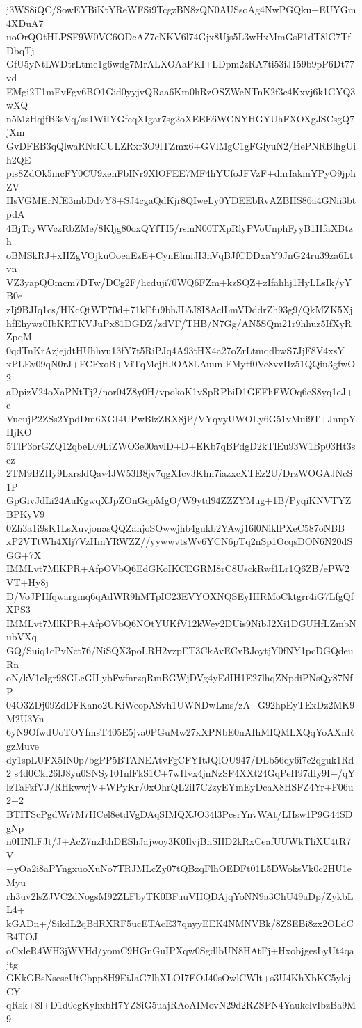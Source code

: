 j3WS8iQC/SowEYBiKtYReWFSi9TcgzBN8zQN0AUSsoAg4NwPGQku+EUYGm4XDuA7
uoOrQOtHLPSF9W0VC6ODcAZ7eNKV6l74Gjx8Ujs5L3wHxMmGsF1dT8lG7TfDbqTj
GfU5yNtLWDtrLtme1g6wdg7MrALXOAaPKI+LDpm2zRA7ti53iJ159b9pP6Dt77vd
EMgi2T1mEvFgv6BO1Gid0yyjvQRaa6Km0hRzOSZWeNTnK2f3c4Kxvj6k1GYQ3wXQ
n5MzHqjfB3sVq/ss1WiIYGfeqXIgar7sg2oXEEE6WCNYHGYUhFXOXgJSCsgQ7jXm
GvDFEB3qQlwaRNtICULZRxr3O9lTZmx6+GVlMgC1gFGlyuN2/HePNRBlhgUih2QE
pis8ZdOk5mcFY0CU9xenFbINr9XlOFEE7MF4hYUfoJFVzF+dnrIakmYPyO9jphZV
HsVGMErNfE3mbDdvY8+SJ4cgaQdKjr8QIweLy0YDEEbRvAZBHS86a4GNii3btpdA
4BjTcyWVczRbZMe/8Kljg80oxQYfTI5/rsmN00TXpRlyPVoUnphFyyB1HfaXBtzh
oBMSkRJ+xHZgVOjkuOoeaEzE+CynElmiJI3nVqBJfCDDxaY9JnG24ru39za6Ltvn
VZ3yapQOmcm7DTw/DCg2F/hcduji70WQ6FZm+kzSQZ+zIfahhj1HyLLsIk/yYB0e
zIj9BJIq1cs/HKcQtWP70d+71kEfu9bhJL5J8I8AclLmVDddrZh93g9/QkMZK5Xj
hfEhywz0IbKRTKVJuPx81DGDZ/zdVF/THB/N7Gg/AN5SQm21r9hhuz5IfXyRZpqM
0qdTnKrAzjejdtHUhhvu13fY7t5RiPJq4A93tHX4a27oZrLtmqdbwS7JjF8V4xsY
xPLEv09qN0rJ+FCFxoB+ViTqMejHJOA8LAuunlFMytf0Vc8vvIIz51QQiu3gfwO2
aDpizV24oXaPNtTj2/nor04Z8y0H/vpokoK1vSpRPbiD1GEFhFWOq6eS8yq1eJ+c
VucujP2ZSs2YpdDm6XGI4UPwBlzZRX8jP/VYqvyUWOLy6G51vMui9T+JnnpYHjKO
5TlP3orGZQ12qbeL09LiZWO3e00avlD+D+EKb7qBPdgD2kTlEu93W1Bp03Ht3scz
2TM9BZHy9LxrsldQav4JW53B8jv7qgXIcv3Khn7iazxcXTEz2U/DrzWOGAJNcS1P
GpGivJdLi24AuKgwqXJpZOnGqpMgO/W9ytd94ZZZYMug+1B/PyqiKNVTYZBPKyV9
0Zh3a1i9sK1LsXuvjonasQQZahjoSOwwjhb4gukb2YAwj16l0NiklPXeC587oNBB
xP2VTtWh4Xlj7VzHmYRWZZ//yywwvtsWv6YCN6pTq2nSp1OcqsDON6N20dSGG+7X
IMMLvt7MlKPR+AfpOVbQ6EdGKoIKCEGRM8rC8UsckRwf1Lr1Q6ZB/ePW2VT+Hy8j
D/VoJPHfqwargmq6qAdWR9hMTpIC23EVYOXNQSEyIHRMoCktgrr4iG7LfgQfXPS3
IMMLvt7MlKPR+AfpOVbQ6NOtYUKfV12kWey2DUis9NibJ2Xi1DGUHfLZmbNubVXq
GQ/Suiq1cPvNct76/NiSQX3poLRH2vzpET3CkAvECvBJoytjY0fNY1pcDGQdeuRn
oN/kV1cIgr9SGLcGILybFwfnrzqRmBGWjDVg4yEdIH1E27lhqZNpdiPNsQy87NfP
04O3ZDj09ZdDFKano2UKiWeopASvh1UWNDwLms/zA+G92hpEyTExDz2MK9M2U3Yn
6yN9OfwdUoTOYfmsT405E5jva0PGuMw27xXPNbE0nAIhMIQMLXQqYoAXnRgzMuve
dy1spLUFX5IN0p/bgPP5BTANEAtvFgCFYItJQlOU947/DLb56qy6i7c2qguk1Rd2
s4d0Ckl26lJ8yu0SNSy101nlFkS1C+7wHvx4jnNzSF4XXt24GqPeH97dIy9I+/qY
lzTaFzfVJ/RHkwwjV+WPyKr/0xOhrQL2iI7C2zyEYmEyDcaX8HSFZ4Yr+F06u2+2
BTITScPgdWr7M7HCel8etdVgDAqSIMQXJO34l3PcsrYnvWAt/LHsw1P9G44SDgNp
n0HNhFJt/J+AcZ7nzIthDEShJajwoy3K0IlvjBnSHD2kRxCeafUUWkTliXU4tR7V
+yOa2i8aPYngxuoXuNo7TRJMLcZy07tQBzqFlhOEDFt01L5DWoksVk0c2HU1eMyu
rh3uv2lsZJVC2dNogsM92ZLFbyTK0BFuuVHQDAjqYoNN9a3ChU49aDp/ZykbLL4+
kGADn+/SikdL2qBdRXRF5ucETAcE37qnyyEEK4NMNVBk/8ZSEBi8zx2OLdCB4TOJ
oCxleR4WH3jWVHd/yomC9HGnGuIPXqw0SgdlbUN8HAtFj+HxobjgesLyUt4qajtg
GKkGBsNsescUtCbpp8H9EiJaG7lhXLOI7EOJ40sOwlCWlt+s3U4KhXbKC5ylejCY
qRsk+8l+D1d0egKyhxbH7YZSiG5uajRAoAIMovN29d2RZSPN4YaukclvIbzBa9M9
